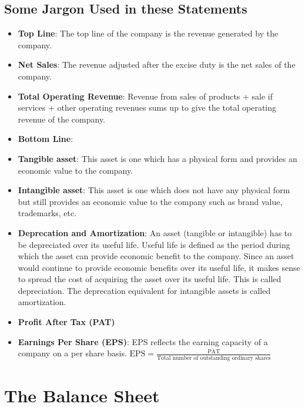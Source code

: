 \subsection{Some Jargon Used in these Statements}
\begin{itemize}
  \item \textbf{Top Line}: The top line of the company is the revenue generated by the company.
  \item \textbf{Net Sales}: The revenue adjusted after the excise duty is the net sales of the company.
  \item \textbf{Total Operating Revenue}: Revenue from sales of products + sale if services + other operating revenues sums up to give the total operating revenue of the company.
  \item \textbf{Bottom Line}: 
  \item \textbf{Tangible asset}: This asset is one which has a physical form and provides an economic value to the company.
  \item \textbf{Intangible asset}: This asset is one which does not have any physical form but still provides an economic value to the company such as brand value, trademarks, etc.
  \item \textbf{Deprecation and Amortization}: An asset (tangible or intangible) has to be depreciated over its useful life. Useful life is defined as the period during which the asset can provide economic benefit to the company. Since an asset would continue to provide economic benefits over its useful life, it makes sense to spread the cost of acquiring the asset over its useful life. This is called depreciation. The deprecation equivalent for intangible assets is called amortization.
  \item \textbf{Profit After Tax (PAT)}
  \item \textbf{Earnings Per Share (EPS)}: EPS reflects the earning capacity of a company on a per share basis. $ \textrm{EPS} = \frac{\textrm{PAT}}{\textrm{Total number of outstanding ordinary shares}} $
\end{itemize}

\section{The Balance Sheet}


